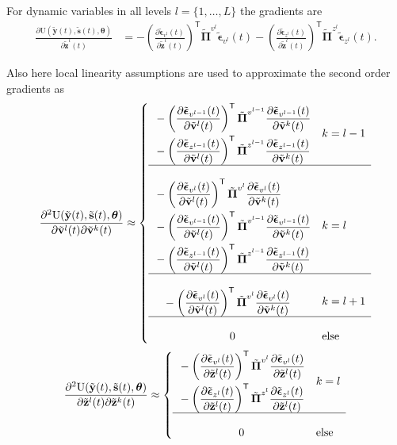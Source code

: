 \documentclass[a4paper,10pt]{article}
\newcommand{\bs}[1]{\mathbf{#1}}					%
\newcommand{\bgs}[1]{\boldsymbol{#1}}				%
\newcommand{\pd}[2]{\frac{\partial #1}{\partial #2}} 	%
\newcommand{\ppd}[3]{\frac{\partial^2 #1}{\partial #2 \partial #3}} %
\newcommand{\tr}{\mathsf{T}}				%
\newcommand{\eq}[1]{\begin{equation} #1 \end{equation}}%
\newcommand{\gc}[1]{\tilde{#1}} %
\renewcommand{\ss}{z}         %
\newcommand{\sv}{v}         %
\newcommand{\so}{y}         %
\newcommand{\st}{s}         %
\newcommand{\spe}{\epsilon} %
\renewcommand{\sp}{\theta}    %
\newcommand{\ps}{\bs{\ss}}    %
\newcommand{\pv}{\bs{\sv}}    %
\newcommand{\po}{\bs{\so}}    %
\newcommand{\pt}{\bs{\st}}     %
\newcommand{\ppe}{\bgs{\spe}} %
\newcommand{\psg}{\gc{\ps}}    %
\newcommand{\pvg}{\gc{\pv}}    %
\newcommand{\ptg}{\gc{\pt}}     %
\newcommand{\pog}{\gc{\po}}    %
\newcommand{\ppeg}{\gc{\ppe}} %
\newcommand{\pp}{\bgs{\sp}} %
\newcommand{\U}{\mathrm{U}}			%
\newcommand{\Prec}{\bgs{\Pi}}			%
\begin{document}
For dynamic variables in all levels $l=\{1,\dots,L\}$ the gradients are
\begin{align}
    \pd{\U(\pog(t),\ptg(t),\pp)}{\psg^l(t)} &=  - \left(\pd{\ppeg_{\sv^{l}}(t)}{\psg^l(t)}\right)^\tr\gc{\Prec}^{\sv^{l}}\ppeg_{\sv^{l}}(t) - \left(\pd{\ppeg_{\ss^{l}}(t)}{\psg^l(t)}\right)^\tr\gc{\Prec}^{\ss^{l}}\ppeg_{\ss^{l}}(t).
\end{align}

Also here local linearity assumptions are used to approximate the second order gradients as
\eq{\label{eq:grad2IntActDvv}
    \ppd{\U(\pog(t),\ptg(t),\pp)}{\pvg^l(t)}{\pvg^k(t)} \approx  \left\{\begin{array}{cl} 
        \begin{split}&- \left(\pd{\ppeg_{\sv^{l-1}}(t)}{\pvg^l(t)}\right)^\tr\gc{\Prec}^{\sv^{l-1}}\pd{\ppeg_{\sv^{l-1}}(t)}{\pvg^k(t)}\\
    &- \left(\pd{\ppeg_{\ss^{l-1}}(t)}{\pvg^l(t)}\right)^\tr\gc{\Prec}^{\ss^{l-1}}\pd{\ppeg_{\ss^{l-1}}(t)}{\pvg^k(t)}\end{split}& k = l-1\\
        \hline\\
        \begin{split} &- \left(\pd{\ppeg_{\sv^{l}}(t)}{\pvg^l(t)}\right)^\tr\gc{\Prec}^{\sv^{l}}\pd{\ppeg_{\sv^{l}}(t)}{\pvg^k(t)}\\
        &- \left(\pd{\ppeg_{\sv^{l-1}}(t)}{\pvg^l(t)}\right)^\tr\gc{\Prec}^{\sv^{l-1}}\pd{\ppeg_{\sv^{l-1}}(t)}{\pvg^k(t)}\\
    &- \left(\pd{\ppeg_{\ss^{l-1}}(t)}{\pvg^l(t)}\right)^\tr\gc{\Prec}^{\ss^{l-1}}\pd{\ppeg_{\ss^{l-1}}(t)}{\pvg^k(t)}\end{split} & k=l\\
        \hline\\
        \begin{split}&- \left(\pd{\ppeg_{\sv^{l}}(t)}{\pvg^l(t)}\right)^\tr\gc{\Prec}^{\sv^{l}}\pd{\ppeg_{\sv^{l}}(t)}{\pvg^k(t)}\end{split}& k = l+1\\
        \hline\\
        0 & \mathrm{else}
    \end{array}\right.
}
\eq{
    \ppd{\U(\pog(t),\ptg(t),\pp)}{\psg^l(t)}{\psg^k(t)} \approx  \left\{\begin{array}{cl}
         \begin{split}&- \left(\pd{\ppeg_{\sv^{l}}(t)}{\psg^l(t)}\right)^\tr\gc{\Prec}^{\sv^{l}}\pd{\ppeg_{\sv^{l}}(t)}{\psg^l(t)}\\ 
        &- \left(\pd{\ppeg_{\ss^{l}}(t)}{\psg^l(t)}\right)^\tr\gc{\Prec}^{\ss^{l}}\pd{\ppeg_{\ss^{l}}(t)}{\psg^l(t)}\end{split} & k=l\\
        \hline\\
        0 & \mathrm{else}\end{array} \right.
}
\end{document}
